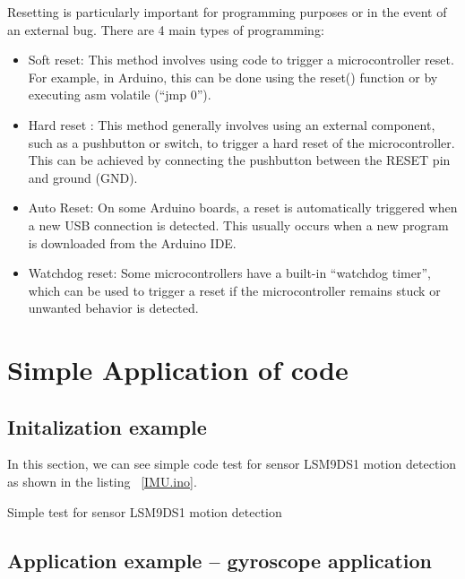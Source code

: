 Resetting is particularly important for programming purposes or in the event of an external bug. There are 4 main types of programming: 

\begin{itemize}
	\item Soft reset: This method involves using code to trigger a microcontroller reset. For example, in Arduino, this can be done using the reset() function or by executing asm volatile (“jmp 0”). \cite{instructables_reset_arduino:2024}
	\item Hard reset : This method generally involves using an external component, such as a pushbutton or switch, to trigger a hard reset of the microcontroller. This can be achieved by connecting the pushbutton between the RESET pin and ground (GND). \cite{arduino_reset:2024}
	\item Auto Reset: On some Arduino boards, a reset is automatically triggered when a new USB connection is detected. This usually occurs when a new program is downloaded from the Arduino IDE. \cite{stackoverflow_reset_arduino:2025}
	\item Watchdog reset: Some microcontrollers have a built-in “watchdog timer”, which can be used to trigger a reset if the microcontroller remains stuck or unwanted behavior is detected. \cite{youtube_watchdog_reset:2025}
	
\end{itemize}

\section{Simple Application of code}

\subsection{Initalization example}

In this section, we can see simple code test for sensor LSM9DS1 motion detection as shown in the listing ~\ref{IMU.ino}.

\begin{code}
	
	
	\caption{Simple test for sensor LSM9DS1 motion detection}\label{IMU.ino}
	
\end{code}

\subsection{Application example -- gyroscope application}

